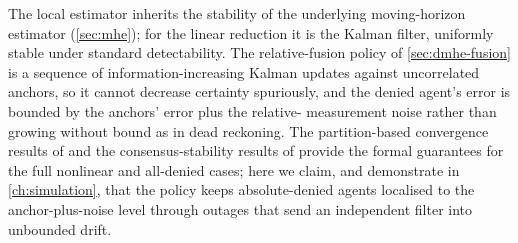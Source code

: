 The local estimator inherits the stability of the underlying moving-horizon
estimator (\cref{sec:mhe}); for the linear reduction it is the Kalman filter,
uniformly stable under standard detectability. The relative-fusion policy of
\cref{sec:dmhe-fusion} is a sequence of information-increasing Kalman updates
against uncorrelated anchors, so it cannot decrease certainty spuriously, and the
denied agent's error is bounded by the anchors' error plus the relative-%
measurement noise rather than growing without bound as in dead reckoning. The
partition-based convergence results of \cite{farina2010distributed} and the
consensus-stability results of \cite{battistelli2019distributed,schneider2017convergence}
provide the formal guarantees for the full nonlinear and all-denied cases; here
we claim, and demonstrate in \cref{ch:simulation}, that the policy keeps
absolute-denied agents localised to the anchor-plus-noise level through outages
that send an independent filter into unbounded drift.

